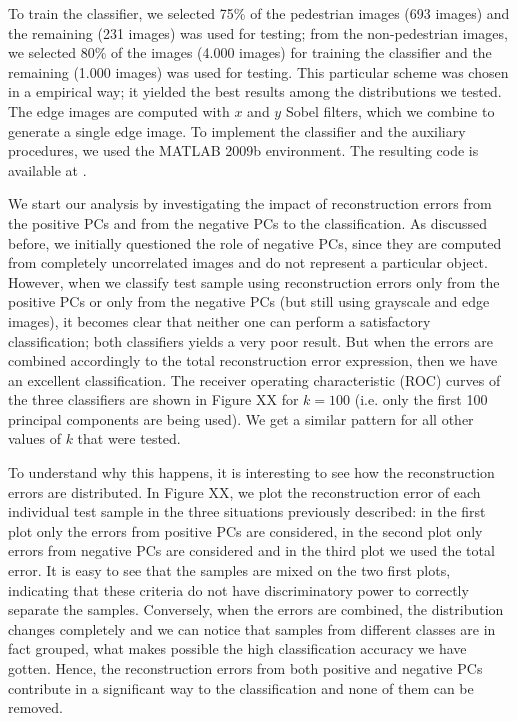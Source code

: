 \documentclass[10pt, conference, compsocconf]{IEEEtran}
\begin{document}
To train the classifier, we selected 75\% of the pedestrian images (693 images) and the remaining (231 images) was used  for testing; from the non-pedestrian images, we selected 80\% of the images (4.000 images) for training the classifier and the remaining (1.000 images) was used for testing. This particular scheme was chosen in a empirical way; it yielded the best results among the distributions we tested. The edge images are computed with $x$ and $y$ Sobel filters, which we combine to generate a single edge image. To implement the classifier and the auxiliary procedures, we used the MATLAB 2009b environment. The resulting code is available at \cite{code}.

We start our analysis by investigating the impact of reconstruction errors from the positive PCs and from the negative PCs to the classification. As discussed before, we initially questioned the role of negative PCs, since they are computed from completely uncorrelated images and do not represent a particular object. However, when we classify test sample using reconstruction errors only from the positive PCs or only from the negative PCs (but still using grayscale and edge images), it becomes clear that neither one can perform a satisfactory classification; both classifiers yields a very poor result. But when the errors are combined accordingly to the total reconstruction error expression, then we have an excellent classification. The receiver operating characteristic (ROC) curves of the three classifiers are shown in Figure XX for $k = 100$ (i.e. only the first 100 principal components are being used). We get a similar pattern for all other values of $k$ that were tested.


To understand why this happens, it is interesting to see how the reconstruction errors are distributed. In Figure XX, we plot the reconstruction error of each individual test sample in the three situations previously described: in the first plot only the errors from positive PCs are considered, in the second plot only errors from negative PCs are considered and in the third plot we used the total error. It is easy to see that the samples are mixed on the two first plots, indicating that these criteria do not have discriminatory power to correctly separate the samples. Conversely, when the errors are combined, the distribution changes completely and we can notice that samples from different classes are in fact grouped, what makes possible the high classification accuracy we have gotten. Hence, the reconstruction errors from both positive and negative PCs contribute in a significant way to the classification and none of them can be removed.
\end{document}

